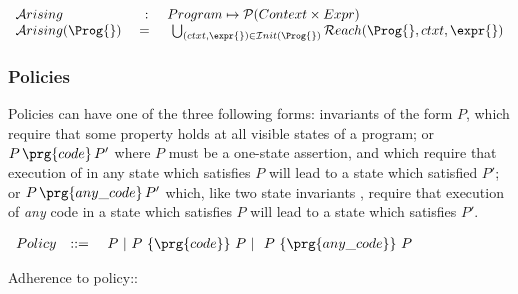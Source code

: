 {\begin{definition} $ $ \\
$\begin{array}{lcl}
 {\mathcal{A}rising} & : &  Program    \mapsto \mathcal{P}( Context \times Expr  )
\\
 {\mathcal{A}rising}(\Prog{}) \ &    = \  & \ \bigcup_{(ctxt,\expr{})\in {\mathcal{I}nit}(\Prog{})} {\mathcal{R}each}(\Prog{}, ctxt, \expr{})
\end{array}$
\end{definition}




\subsubsection{Policies}

Policies can have one of the three following forms:   invariants of the form $P$, which require that some property holds at all visible states of a program; or  $P\, {\prg{code}}\, P'$ where $P$ must be a one-state assertion, and which require that execution of  in any state which satisfies $P$ will lead to a state which satisfied $P'$; or  $P\, {\prg{any\_code}}\, P'$ which, like two state invariants \cite{???}, require that execution of {\em any} code in a state which satisfies $P$ will lead to a state which satisfies $P'$.


\begin{definition}[Policies]
 $ ~ $ \\
 $
\begin{array}{lclcl}
Policy &  ::= & \ P \ | \  P \ \{ \prg{code} \}\  P \ | \ \  P \ \{ \prg{any\_code} \}\ P
\end{array}
$

\noindent
Adherence to policy::


\end{definition}}
